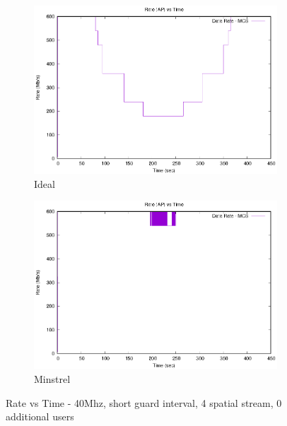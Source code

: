 \documentclass[12]{article}
\begin{document}
\begin{figure}[!htb]
\begin{subfigure}{.5\textwidth}
  \centering
  \includegraphics[width=\linewidth]{"40Mhz_Short_4SS_0AU/Ideal/TimeRate"}
  \caption{Ideal}
  \label{fig:40_id_rt}
\end{subfigure}%
\begin{subfigure}{.5\textwidth}
  \includegraphics[width=\linewidth]{"40Mhz_Short_4SS_0AU/MinstrelHt/TimeRate"}
  \caption{Minstrel}
  \label{fig:40_mi_rt}
\end{subfigure}%
\caption{Rate vs Time - 40Mhz, short guard interval, 4 spatial stream, 0 additional users}
\label{fig:40_rt}
\end{figure}
\end{document}
